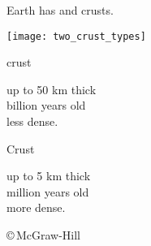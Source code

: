 \documentclass[t]{beamer}
\begin{document}
\begin{frame}[t]{Earth has  and  crusts.}

\begin{multicols}{2}

\texttt{[image: two\_crust\_types]}

\columnbreak

\hangpara {} crust

\hangpara\quad up to 50 km thick\\
 billion years old\\
\quad less dense.

\hangpara {} Crust

\hangpara\quad up to 5 km thick\\
 million years old\\
\quad more dense.

\end{multicols}

\vfilll

\hfill \tiny \copyright\,McGraw-Hill

\end{frame}
%
\end{document}
